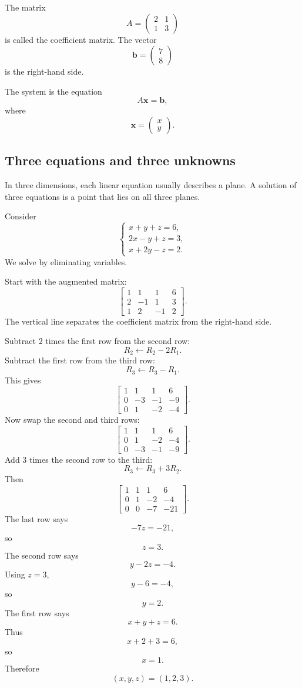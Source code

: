 The matrix
\[
    A=
    \begin{pmatrix}
        2&1\\
        1&3
    \end{pmatrix}
\]
is called the coefficient matrix.  The vector
\[
    \mathbf b=
    \begin{pmatrix}
        7\\8
    \end{pmatrix}
\]
is the right-hand side.

The system is the equation
\[
    A\mathbf x=\mathbf b,
\]
where
\[
    \mathbf x=
    \begin{pmatrix}
        x\\y
    \end{pmatrix}.
\]

\subsection{Three equations and three unknowns}

In three dimensions, each linear equation usually describes a plane.  A solution of
three equations is a point that lies on all three planes.

Consider
\[
\begin{cases}
x+y+z=6,\\
2x-y+z=3,\\
x+2y-z=2.
\end{cases}
\]
We solve by eliminating variables.

Start with the augmented matrix:
\[
\left[
\begin{array}{ccc|c}
1&1&1&6\\
2&-1&1&3\\
1&2&-1&2
\end{array}
\right].
\]
The vertical line separates the coefficient matrix from the right-hand side.

Subtract \(2\) times the first row from the second row:
\[
R_2\leftarrow R_2-2R_1.
\]
Subtract the first row from the third row:
\[
R_3\leftarrow R_3-R_1.
\]
This gives
\[
\left[
\begin{array}{ccc|c}
1&1&1&6\\
0&-3&-1&-9\\
0&1&-2&-4
\end{array}
\right].
\]
Now swap the second and third rows:
\[
\left[
\begin{array}{ccc|c}
1&1&1&6\\
0&1&-2&-4\\
0&-3&-1&-9
\end{array}
\right].
\]
Add \(3\) times the second row to the third:
\[
R_3\leftarrow R_3+3R_2.
\]
Then
\[
\left[
\begin{array}{ccc|c}
1&1&1&6\\
0&1&-2&-4\\
0&0&-7&-21
\end{array}
\right].
\]
The last row says
\[
    -7z=-21,
\]
so
\[
    z=3.
\]
The second row says
\[
    y-2z=-4.
\]
Using \(z=3\),
\[
    y-6=-4,
\]
so
\[
    y=2.
\]
The first row says
\[
    x+y+z=6.
\]
Thus
\[
    x+2+3=6,
\]
so
\[
    x=1.
\]
Therefore
\[
\boxed{
    (x,y,z)=(1,2,3).
}
\]

